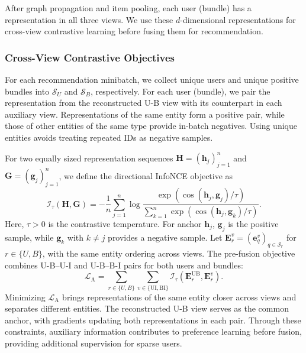 \documentclass[letterpaper,journal]{IEEEtran}
\begin{document}
After graph propagation and item pooling, each user (bundle) has a representation in all three views. We use these $d$-dimensional representations for cross-view contrastive learning before fusing them for recommendation.

\subsubsection{Cross-View Contrastive Objectives}

For each recommendation minibatch, we collect unique users and unique positive bundles into $\mathcal S_U$ and $\mathcal S_B$, respectively. For each user (bundle), we pair the representation from the reconstructed U-B view with its counterpart in each auxiliary view. Representations of the same entity form a positive pair, while those of other entities of the same type provide in-batch negatives. Using unique entities avoids treating repeated IDs as negative samples.

For two equally sized representation sequences $\mathbf H=(\mathbf h_j)_{j=1}^{n}$ and $\mathbf G=(\mathbf g_j)_{j=1}^{n}$, we define the directional InfoNCE objective \cite{oord2018cpc} as
\begin{equation}
\mathcal I_\tau(\mathbf H,\mathbf G)
=-\frac{1}{n}\sum_{j=1}^{n}
\log
\frac{\exp\!\left(\cos(\mathbf h_j,\mathbf g_j)/\tau\right)}
{\sum_{k=1}^{n}
\exp\!\left(\cos(\mathbf h_j,\mathbf g_k)/\tau\right)}.
\tag{15}
\end{equation}
Here, $\tau>0$ is the contrastive temperature. For anchor $\mathbf h_j$, $\mathbf g_j$ is the positive sample, while $\mathbf g_k$ with $k\neq j$ provides a negative sample. Let $\mathbf E_r^v=(\mathbf e_q^v)_{q\in\mathcal S_r}$ for $r\in\{U,B\}$, with the same entity ordering across views. The pre-fusion objective combines U-B--U-I and U-B--B-I pairs for both users and bundles:
\begin{equation}
\mathcal L_{\mathrm A}
=\sum_{r\in\{U,B\}}
\sum_{v\in\{\mathrm{UI},\mathrm{BI}\}}
\mathcal I_\tau\!\left(\mathbf E_r^{\mathrm{UB}},\mathbf E_r^v\right).
\tag{16}
\end{equation}
Minimizing $\mathcal L_{\mathrm A}$ brings representations of the same entity closer across views and separates different entities. The reconstructed U-B view serves as the common anchor, with gradients updating both representations in each pair. Through these constraints, auxiliary information contributes to preference learning before fusion, providing additional supervision for sparse users.
\end{document}
